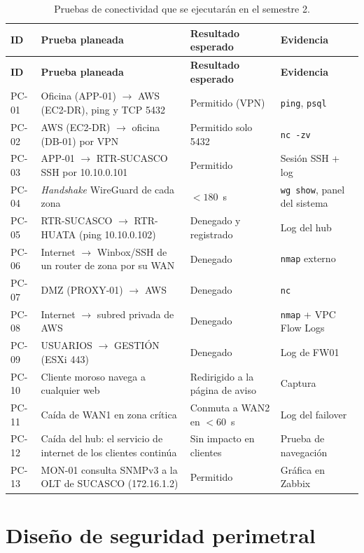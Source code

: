 {\small
\begin{longtable}{L{0.9cm}L{6.4cm}L{2.6cm}L{3.6cm}}
\caption{Pruebas de conectividad que se ejecutarán en el semestre 2.}\label{tab:ce03-pruebas}\\
\toprule
\textbf{ID} & \textbf{Prueba planeada} & \textbf{Resultado esperado} & \textbf{Evidencia} \\
\midrule
\endfirsthead
\toprule
\textbf{ID} & \textbf{Prueba planeada} & \textbf{Resultado esperado} & \textbf{Evidencia} \\
\midrule
\endhead
\bottomrule
\endlastfoot
PC-01 & Oficina (APP-01) $\rightarrow$ AWS (EC2-DR), ping y TCP 5432 & Permitido (VPN) & \texttt{ping}, \texttt{psql} \\
PC-02 & AWS (EC2-DR) $\rightarrow$ oficina (DB-01) por VPN & Permitido solo 5432 & \texttt{nc -zv} \\
PC-03 & APP-01 $\rightarrow$ RTR-SUCASCO SSH por 10.10.0.101 & Permitido & Sesión SSH + log \\
PC-04 & \emph{Handshake} WireGuard de cada zona & $< 180$~s & \texttt{wg show}, panel del sistema \\
PC-05 & RTR-SUCASCO $\rightarrow$ RTR-HUATA (ping 10.10.0.102) & Denegado y registrado & Log del hub \\
PC-06 & Internet $\rightarrow$ Winbox/SSH de un router de zona por su WAN & Denegado & \texttt{nmap} externo \\
PC-07 & DMZ (PROXY-01) $\rightarrow$ AWS & Denegado & \texttt{nc} \\
PC-08 & Internet $\rightarrow$ subred privada de AWS & Denegado & \texttt{nmap} + VPC Flow Logs \\
PC-09 & USUARIOS $\rightarrow$ GESTIÓN (ESXi 443) & Denegado & Log de FW01 \\
PC-10 & Cliente moroso navega a cualquier web & Redirigido a la página de aviso & Captura \\
PC-11 & Caída de WAN1 en zona crítica & Conmuta a WAN2 en $< 60$~s & Log del failover \\
PC-12 & Caída del hub: el servicio de internet de los clientes continúa & Sin impacto en clientes & Prueba de navegación \\
PC-13 & MON-01 consulta SNMPv3 a la OLT de SUCASCO (172.16.1.2) & Permitido & Gráfica en Zabbix \\
\end{longtable}
}

\section{Diseño de seguridad perimetral}

